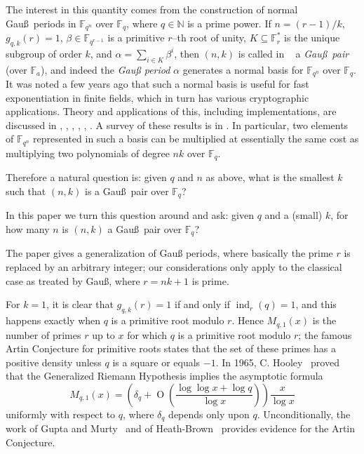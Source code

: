 \documentclass[twoside,final,reqno,noamsfonts]{birkartspecial}
\begin{document}
The interest in this quantity comes from the
construction of normal Gau\ss\ periods in ${\mathbb F}_{q^n}$ over
${\mathbb F}_q$, where $q \in {\mathbb N}$ is a prime power. If
$n = (r-1)/k$, $g_{q,k} (r) = 1$, $\beta \in {\mathbb F}_{q^{r-1}}$ is
 a primitive $r$--th root of unity,
$K \subseteq {\mathbb F}^{*}_r$ is
the unique subgroup of order $k$, and
$\alpha  = \sum_{i \in K} \beta^i$,
then $(n, k)$ is called in ~\cite{gaogat95} a \emph{Gau\ss\ pair}
(over ${\mathbb F}_a$), and indeed the {\em Gau{\ss} period} $\alpha$ generates
a normal basis for ${\mathbb F}_{q^n}$ over ${\mathbb F}_q$.
It was noted a few years ago that
such a normal basis is useful for fast exponentiation
in finite fields, which in turn has various
cryptographic applications. Theory and applications of this,
including implementations, are discussed in
\cite{gaogat95}, \cite{gaogat98}, \cite{gaogat00},
\cite{gaolen92},
\cite{gatnoe97}, \cite{gatnoe99a}.
A survey of these results is in
\cite{gatshp00a}.
In particular, two elements of ${\mathbb F}_{q^n}$
represented in such a basis can be multiplied
at essentially the same cost as multiplying
two polynomials of degree $nk$ over ${\mathbb F}_q$.

Therefore a natural question is:
given $q$ and $n$ as above,
what is the smallest $k$ such that $(n,k)$
is a Gau\ss\ pair over ${\mathbb F}_q$?

In this paper we turn this question around
and ask: given $q$ and a (small) $k$,
for how many $n$ is $(n,k)$ a Gau\ss\ pair
over ${\mathbb F}_q$?

The paper \cite{feigat99}
gives a generalization of Gau{\ss} periods, where
basically the prime $r$ is replaced by an arbitrary integer;
our considerations only apply to the classical case as treated
by Gau{\ss}, where $r=nk+1$ is prime.

For $k=1$, it is clear that $g_{q,k}(r)=1$ if and only if
$\operatorname{ind}_r(q)=1$, and this happens exactly when $q$ is a primitive root
$\text{modulo } r$. Hence $M_{q,1}(x)$ is the number of primes $r$ up to $x$ for which
$q$  is a primitive root $\text{modulo } r$;
the famous Artin Conjecture
for primitive roots states that the set of these primes has a positive
density
unless $q$ is a square or equals $-1$. In 1965, C. Hooley~\cite{H}
proved that the Generalized Riemann Hypothesis implies the asymptotic formula
$$M_{q,1}(x)=\left(\delta_q+\operatorname{O}\left(\frac{\log\log x +\log q}{\log x}\right)\right)
\frac{x}{\log x} $$
uniformly with respect to $q$, where $\delta_q$  depends only
upon $q$. Unconditionally, the work of Gupta and  Murty~\cite{GM}
and of Heath-Brown~\cite{HB} provides evidence for the Artin Conjecture.
\end{document}
